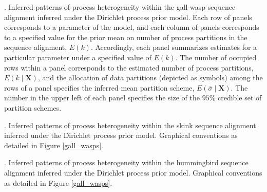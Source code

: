 \documentclass[11pt]{article}
\begin{document}
{. Inferred patterns of process heterogeneity within the gall-wasp sequence alignment inferred under the Dirichlet process prior model.  Each row of panels corresponds to a parameter of the model, and each column of panels corresponds to a specified value for the prior mean on number of process partitions in the sequence alignment, $E(k)$.  Accordingly, each panel summarizes estimates for a particular parameter under a specified value of $E(k)$.  The number of occupied rows within a panel corresponds to the estimated number of process partitions, $E(k \mid \mathbf{X})$, and the allocation of data partitions (depicted as symbols) among the rows of a panel specifies the inferred mean partition scheme, $E(\bar{\sigma} \mid \mathbf{X})$.  The number in the upper left of each panel specifies the size of the $95\%$ credible set of partition schemes.  

\bigskip

. Inferred patterns of process heterogeneity within the skink sequence alignment inferred under the Dirichlet process prior model.  Graphical conventions as detailed in Figure \ref{gall_wasps}.

\bigskip

. Inferred patterns of process heterogeneity within the hummingbird sequence alignment inferred under the Dirichlet process prior model.  Graphical conventions as detailed in Figure \ref{gall_wasps}.

}

\newpage
\end{document}
